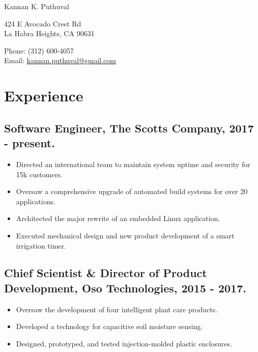 \documentclass[letterpaper]{article}
\def\name{Kannan K. Puthuval}
\begin{document}
{\huge \name}


\vspace{0.25in}

\begin{minipage}{0.45\linewidth}
  424 E Avocado Crest Rd \\
  La Habra Heights, CA 90631 \\
\end{minipage}
\begin{minipage}{0.45\linewidth}
  Phone: (312) 600-4057 \\
  Email: \href{mailto:kannan.puthuval@gmail.com}{kannan.puthuval@gmail.com} \\
\end{minipage}

\section*{Experience}
  
  \subsection*{Software Engineer, The Scotts Company, 2017 - present.}

    \begin{itemize}

      \item Directed an international team to maintain system uptime and security for 15k customers.
      \item Oversaw a comprehensive upgrade of automated build systems for over 20 applications.
      \item Architected the major rewrite of an embedded Linux application.
      \item Executed mechanical design and new product development of a smart irrigation timer.

    \end{itemize}

  \subsection*{Chief Scientist \& Director of Product Development, Oso Technologies, 2015 - 2017.}

    \begin{itemize}

      \item Oversaw the development of four intelligent plant care products.
      \item Developed a technology for capacitive soil moisture sensing.
      \item Designed, prototyped, and tested injection-molded plastic enclosures.

    \end{itemize}
\end{document}
